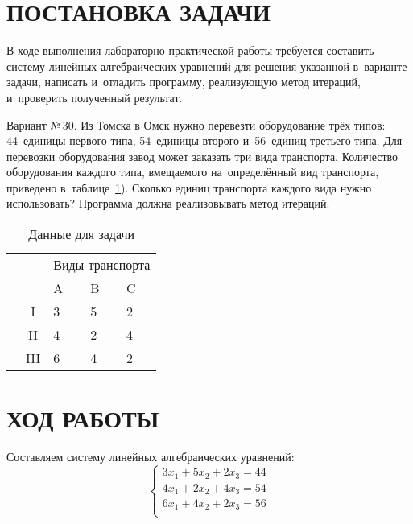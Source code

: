 \documentclass[14pt]{extarticle}
\begin{document}


\cfoot{\thepage}

\section{\MakeUppercase{Постановка задачи}}

В ходе выполнения лабораторно-практической работы требуется составить систему линейных алгебраических уравнений для решения указанной в~варианте задачи, написать и~отладить программу, реализующую метод итераций, и~проверить полученный результат.

Вариант №\,30. Из Томска в Омск нужно перевезти оборудование трёх типов: 44~единицы первого типа, 54~единицы второго и~56~единиц третьего типа. Для перевозки оборудования завод может заказать три вида транспорта. Количество оборудования каждого типа, вмещаемого на~определённый вид транспорта, приведено в~таблице~\ref{table:task}). Сколько единиц транспорта каждого вида нужно использовать? Программа должна реализовывать метод итераций.

\begin{table}[!h]
	\caption{Данные для задачи}
	\centering
	\label{table:task}
	\begin{tabular}{ccp{20pt}p{20pt}p{20pt}}
		\toprule
		&  & \multicolumn{3}{c}{Виды транспорта} \\
		\cmidrule{3-5}
		& & A & B & C \\
		\midrule
		\multirow{3}{10pt}{\rotatebox[origin=c]{90}{\small{Оборуд.}}}
            & I   & 3 & 5 & 2 \\
		& II  & 4 & 2 & 4 \\
		& III & 6 & 4 & 2 \\
		\bottomrule
	\end{tabular}
\end{table}

\newpage

\section{\MakeUppercase{Ход работы}}

Составляем систему линейных алгебраических уравнений:
$$\begin{cases}
3x_1 + 5x_2 + 2x_3 = 44 \\
4x_1 + 2x_2 + 4x_3 = 54 \\
6x_1 + 4x_2 + 2x_3 = 56 \\
\end{cases}$$
\end{document}
